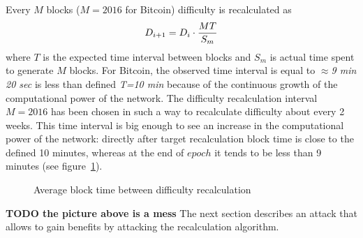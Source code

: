 \documentclass[number,preprint,review]{elsarticle}
\begin{document}

Every \(M\) blocks (\(M=2016\) for Bitcoin) difficulty is recalculated as
\begin{equation}
D_{i+1}=D_i \cdot {MT\over S_m}
\end{equation}
where \(T\) is the expected time interval between blocks and \(S_m\) is actual time spent to generate \(M\) blocks.
For Bitcoin, the observed time interval is equal to $\approx$\textit{9 min 20 sec} is less than defined \textit{T=10 min} because of the continuous growth of the computational power of the network.
The difficulty recalculation interval \(M=2016\) has been chosen in such a way to recalculate difficulty about every 2 weeks.
This time interval is big enough to see an increase in the computational power of the network: directly after target recalculation block time is close to the defined 10 minutes, whereas at the end of \(epoch\) it tends to be less than 9 minutes (see figure~\ref{fig:image}).

\begin{figure}[H]
\caption{Average block time between difficulty recalculation}
\label{fig:image}
\end{figure}

\textbf{TODO the picture above is a mess}
The next section describes an attack that allows to gain benefits by attacking the recalculation algorithm.
\end{document}
